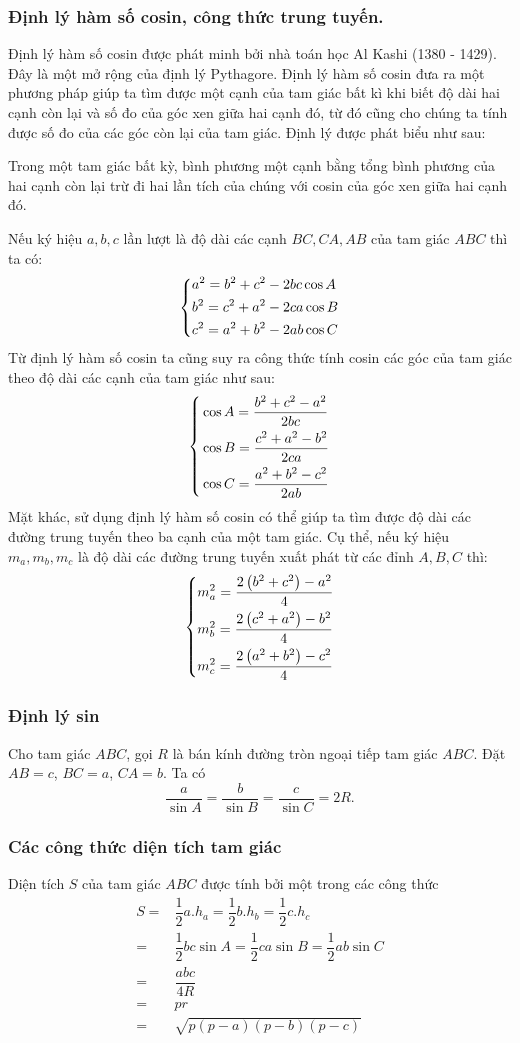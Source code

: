 \subsubsection{Định lý hàm số cosin, công thức trung tuyến.}
Định lý hàm số cosin được phát minh bởi nhà toán học Al Kashi (1380 - 1429). Đây là một mở rộng của định lý Pythagore. Định lý hàm số cosin đưa ra một phương pháp giúp ta tìm được một cạnh của tam giác bất kì khi biết độ dài hai cạnh còn lại và số đo của góc xen giữa hai cạnh đó, từ đó cũng cho chúng ta tính được số đo của các góc còn lại của tam giác. Định lý được phát biểu như sau:
\begin{dl}
	Trong một tam giác bất kỳ, bình phương một cạnh bằng tổng bình phương của hai cạnh còn lại trừ đi hai lần tích của chúng với cosin của góc xen giữa hai cạnh đó.
\end{dl}
Nếu ký hiệu $a, b, c$ lần lượt là độ dài các cạnh $BC, CA, AB$ của tam giác $ABC$ thì ta có:
$$\left\{\begin{aligned}&a^2=b^2+c^2-2bc\cos A\\&b^2=c^2+a^2-2ca\cos B\\&c^2=a^2+b^2-2ab\cos C\end{aligned}\right.$$
Từ định lý hàm số cosin ta cũng suy ra công thức tính cosin các góc của tam giác theo độ dài các cạnh của tam giác như sau:
$$\left\{\begin{aligned}&\cos A=\dfrac{b^2+c^2-a^2}{2bc}\\&\cos B=\dfrac{c^2+a^2-b^2}{2ca}\\&\cos C=\dfrac{a^2+b^2-c^2}{2ab}\end{aligned}\right.$$
Mặt khác, sử dụng định lý hàm số cosin có thể giúp ta tìm được độ dài các đường trung tuyến theo ba cạnh của một tam giác. Cụ thể, nếu ký hiệu $m_a, m_b, m_c$ là độ dài các đường trung tuyến xuất phát từ các đỉnh $A, B, C$ thì:
$$\left\{\begin{aligned}&m_a^2=\dfrac{2\left(b^2+c^2\right)-a^2}{4}\\&m_b^2=\dfrac{2\left(c^2+a^2\right)-b^2}{4}\\&m_c^2=\dfrac{2\left(a^2+b^2\right)-c^2}{4}\end{aligned}\right.$$
\subsubsection{Định lý sin}
\begin{dl}
Cho tam giác $ABC$, gọi $R$ là bán kính đường tròn ngoại tiếp tam giác $ABC$. Đặt $AB=c$, $BC=a$, $CA=b$. Ta có
$$\dfrac{a}{\sin A}=\dfrac{b}{\sin B}=\dfrac{c}{\sin C}=2R.$$
\end{dl}
\subsubsection{Các công thức diện tích tam giác}
Diện tích $S$ của tam giác $ABC$ được tính bởi một trong các công thức
\begin{align*}
S=&\dfrac{1}{2}a.h_a=\dfrac{1}{2}b.h_b=\dfrac{1}{2}c.h_c\\
=&\dfrac{1}{2}bc\sin A=\dfrac{1}{2}ca\sin B=\dfrac{1}{2}ab\sin C \\
=& \dfrac{abc}{4R} \\
=& pr \\
=& \sqrt{p(p-a)(p-b)(p-c)}
\end{align*}
